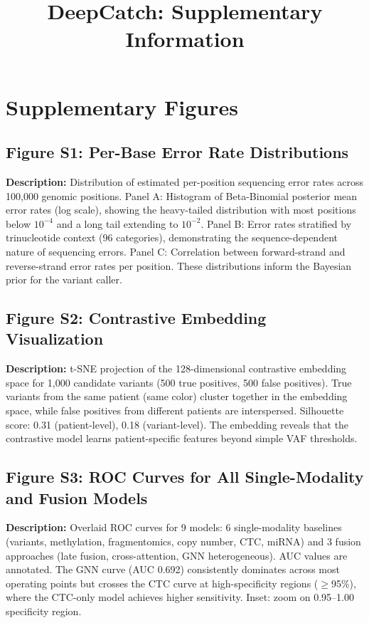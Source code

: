 \documentclass[10pt,a4paper]{article}
\title{\textbf{DeepCatch: Supplementary Information}}
\date{}
\begin{document}
\maketitle

\tableofcontents

\newpage

\section{Supplementary Figures}

\subsection*{Figure S1: Per-Base Error Rate Distributions}
\textbf{Description:} Distribution of estimated per-position sequencing error rates across 100,000 genomic positions. Panel A: Histogram of Beta-Binomial posterior mean error rates (log scale), showing the heavy-tailed distribution with most positions below $10^{-4}$ and a long tail extending to $10^{-2}$. Panel B: Error rates stratified by trinucleotide context (96 categories), demonstrating the sequence-dependent nature of sequencing errors. Panel C: Correlation between forward-strand and reverse-strand error rates per position. These distributions inform the Bayesian prior for the variant caller.

\subsection*{Figure S2: Contrastive Embedding Visualization}
\textbf{Description:} t-SNE projection of the 128-dimensional contrastive embedding space for 1,000 candidate variants (500 true positives, 500 false positives). True variants from the same patient (same color) cluster together in the embedding space, while false positives from different patients are interspersed. Silhouette score: 0.31 (patient-level), 0.18 (variant-level). The embedding reveals that the contrastive model learns patient-specific features beyond simple VAF thresholds.

\subsection*{Figure S3: ROC Curves for All Single-Modality and Fusion Models}
\textbf{Description:} Overlaid ROC curves for 9 models: 6 single-modality baselines (variants, methylation, fragmentomics, copy number, CTC, miRNA) and 3 fusion approaches (late fusion, cross-attention, GNN heterogeneous). AUC values are annotated. The GNN curve (AUC 0.692) consistently dominates across most operating points but crosses the CTC curve at high-specificity regions ($\geq$95\%), where the CTC-only model achieves higher sensitivity. Inset: zoom on 0.95--1.00 specificity region.
\end{document}
